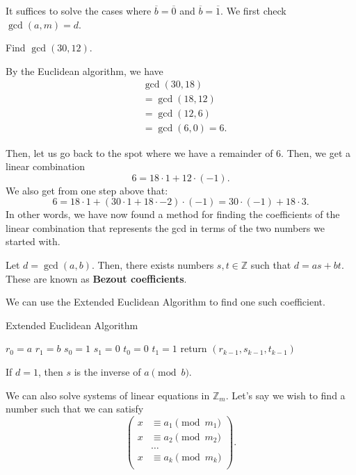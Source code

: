 \documentclass[a4paper]{article}
\begin{document}
It suffices to solve the cases where \( \overline{b}=\overline{0}   \) and \( \overline{b}=\overline{1}   \). We first check \( \gcd(a,m)=d \).

\begin{eg}
	Find \( \gcd(30,12) \).
\end{eg}

By the Euclidean algorithm, we have
\begin{align*}
	& \gcd(30, 18) \tag{\( 30=18\cdot 1 + 12 \)} \\
	&= \gcd(18, 12) \tag{\( 18=12\cdot 1 + 6 \)} \\
	&= \gcd(12, 6) \tag{\( 12=6\cdot 2 + 0 \)} \\
	&= \gcd(6,0) = 6
.\end{align*}

Then, let us go back to the spot where we have a remainder of 6. Then, we get a linear combination \[
	6 = 18 \cdot 1 + 12 \cdot (-1)
.\] We also get from one step above that: \[
	6 = 18 \cdot 1 + (30 \cdot 1 + 18 \cdot -2) \cdot (-1) = 30 \cdot (-1) + 18 \cdot 3
.\] In other words, we have now found a method for finding the coefficients of the linear combination that represents the gcd in terms of the two numbers we started with. 

\begin{definition}	
	Let \( d=\gcd(a,b) \). Then, there exists numbers \( s,t \in \mathbb{Z} \) such that \( d=as+bt \). These are known as \textbf{Bezout coefficients}.
\end{definition}

We can use the Extended Euclidean Algorithm to find one such coefficient.

\begin{algorithm}
	\caption{Extended Euclidean Algorithm}
	\( r_0=a \)\;
	\( r_1=b \)\;
	\( s_0=1 \)\;
	\( s_1=0 \)\;
	\( t_0=0 \)\;
	\( t_1=1 \)\;
	return \( (r_{k-1}, s_{k-1}, t_{k-1}) \)\;
\end{algorithm}

\begin{remark}
	If \( d=1 \), then \( s \) is the inverse of \( a \pmod b \).
\end{remark}

We can also solve systems of linear equations in \( \mathbb{Z}_m \). Let's say we wish to find a number such that we can satisfy \[
	\begin{pmatrix}
		x &\equiv a_1 \pmod {m_1} \\
		x &\equiv a_2 \pmod {m_2} \\
			& \hdots \\
		x &\equiv a_k \pmod {m_k} \\
	\end{pmatrix}
.\] 
\end{document}
